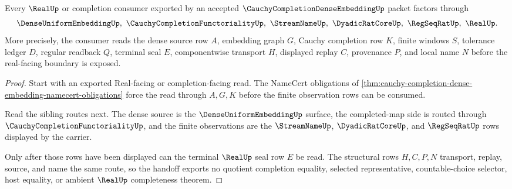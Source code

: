 \begin{theorem}
\label{thm:cauchy-completion-dense-embedding-real-seal-handoff}
Every $\RealUp$ or completion consumer exported by an accepted $\CauchyCompletionDenseEmbeddingUp$ packet factors through
$$
\DenseUniformEmbeddingUp,\ \CauchyCompletionFunctorialityUp,\ \StreamNameUp,\ \DyadicRatCoreUp,\ \RegSeqRatUp,\ \RealUp .
$$
More precisely, the consumer reads the dense source row $A$, embedding graph $G$, Cauchy completion row $K$, finite windows $S$, tolerance ledger $D$, regular readback $Q$, terminal seal $E$, componentwise transport $H$, displayed replay $C$, provenance $P$, and local name $N$ before the real-facing boundary is exposed.
\end{theorem}
\begin{proof}
Start with an exported Real-facing or completion-facing read. The NameCert obligations of \autoref{thm:cauchy-completion-dense-embedding-namecert-obligations} force the read through $A,G,K$ before the finite observation rows can be consumed.

Read the sibling routes next. The dense source is the $\DenseUniformEmbeddingUp$ surface, the completed-map side is routed through $\CauchyCompletionFunctorialityUp$, and the finite observations are the $\StreamNameUp$, $\DyadicRatCoreUp$, and $\RegSeqRatUp$ rows displayed by the carrier.

Only after those rows have been displayed can the terminal $\RealUp$ seal row $E$ be read. The structural rows $H,C,P,N$ transport, replay, source, and name the same route, so the handoff exports no quotient completion equality, selected representative, countable-choice selector, host equality, or ambient $\RealUp$ completeness theorem.
\end{proof}


